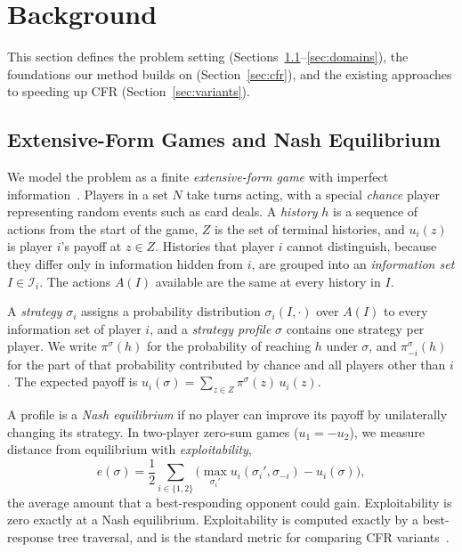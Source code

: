 \section{Background}

This section defines the problem setting (Sections~\ref{sec:efg}--\ref{sec:domains}), the
foundations our method builds on (Section~\ref{sec:cfr}), and the existing approaches to
speeding up CFR (Section~\ref{sec:variants}).

\subsection{Extensive-Form Games and Nash Equilibrium}
\label{sec:efg}

We model the problem as a finite \emph{extensive-form game} with imperfect
information~\cite{shoham2008multiagent}. Players in a set $N$ take turns acting, with a special
\emph{chance} player representing random events such as card deals. A \emph{history} $h$ is a
sequence of actions from the start of the game, $Z$ is the set of terminal histories, and
$u_i(z)$ is player $i$'s payoff at $z \in Z$. Histories that player $i$ cannot distinguish,
because they differ only in information hidden from $i$, are grouped into an \emph{information
set} $I \in \mathcal{I}_i$. The actions $A(I)$ available are the same at every history in $I$.

A \emph{strategy} $\sigma_i$ assigns a probability distribution $\sigma_i(I,\cdot)$ over $A(I)$
to every information set of player $i$, and a \emph{strategy profile} $\sigma$ contains one
strategy per player. We write $\pi^\sigma(h)$ for the probability of reaching $h$ under
$\sigma$, and $\pi^\sigma_{-i}(h)$ for the part of that probability contributed by chance and
all players other than $i$. The expected payoff is $u_i(\sigma) = \sum_{z\in Z}\pi^\sigma(z)\,
u_i(z)$.

A profile is a \emph{Nash equilibrium} if no player can improve its payoff by unilaterally
changing its strategy. In two-player zero-sum games ($u_1 = -u_2$), we measure distance from
equilibrium with \emph{exploitability},
\begin{equation}
  e(\sigma) = \frac{1}{2}\sum_{i\in\{1,2\}}\Big(\max_{\sigma_i'} u_i(\sigma_i',\sigma_{-i})
  - u_i(\sigma)\Big),
  \label{eq:expl}
\end{equation}
the average amount that a best-responding opponent could gain. Exploitability is zero exactly
at a Nash equilibrium. Exploitability is computed exactly by a best-response tree traversal, and is the
standard metric for comparing CFR variants~\cite{tammelin2015solving, brown2019solving}.

